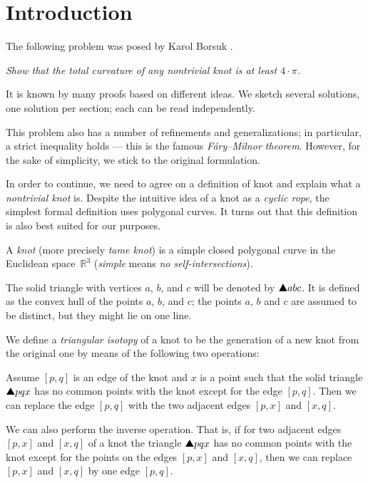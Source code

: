 \section*{Introduction}

The following problem was posed by Karol Borsuk \cite{borsuk}.

\smallskip

\textit{Show that the total curvature of any nontrivial knot is at least $4\cdot\pi$.}

\smallskip

It is known by many proofs based on different ideas.
We sketch several solutions, one solution per section;
each can be read independently.

This problem also has a number of refinements and generalizations;
in particular, a strict inequality holds --- this is the famous \emph{Fáry--Milnor theorem}.
However, for the sake of simplicity, we stick to the original formulation.

In order to continue, we need to agree on a definition of knot and explain what a \emph{nontrivial knot} is.
Despite the intuitive idea of a knot as a \emph{cyclic rope},
the simplest formal definition uses polygonal curves.
It turns out that this definition is also best suited for our purposes.

A \emph{knot} (more precisely \emph{tame knot}) is a simple closed polygonal curve in the Euclidean space~$\mathbb{R}^3$ (\emph{simple} means \emph{no self-intersections}).

The solid triangle with vertices $a$, $b$, and $c$ will be denoted by $\solidtriangle abc$.
It is defined as the convex hull of the points $a$, $b$, and $c$;
the points $a$, $b$ and $c$ are assumed to be distinct, but they might lie on one line.

We define a \emph{triangular isotopy} of a knot to be the generation of a new knot from the original one by means of the
following two operations:

Assume $[p,q]$ is an edge of the knot and $x$
is a point such that the solid triangle $\solidtriangle pqx$  has no common points with the knot except for the edge $[p,q]$.
Then we can replace the edge $[p,q]$ with the two adjacent edges $[p,x]$ and $[x,q]$.

We can also perform the inverse operation.
That is, if for two adjacent edges $[p,x]$ and $[x,q]$ of a knot the triangle
$\solidtriangle pqx$ has no common points with the knot except for the points on the edges $[p,x]$ and $[x,q]$,
then we can replace $[p,x]$ and $[x,q]$ by one edge $[p,q]$.

